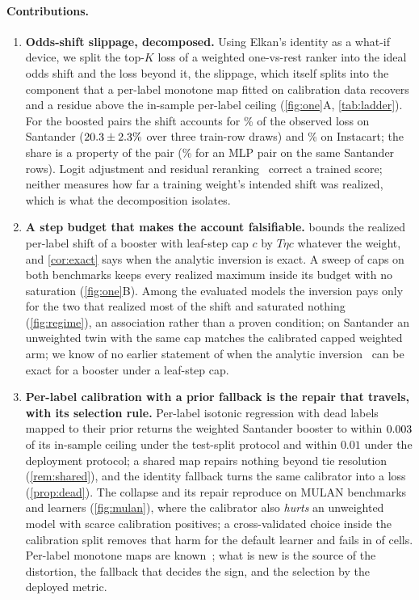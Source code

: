 \documentclass[runningheads]{llncs}
\begin{document}
\paragraph{Contributions.}
\begin{enumerate}[leftmargin=*,nosep]
\item \textbf{Odds-shift slippage, decomposed.} Using Elkan's identity as a what-if device, we split the top-$K$ loss of a weighted one-vs-rest ranker into the ideal odds shift and the loss beyond it, the slippage, which itself splits into the component that a per-label monotone map fitted on calibration data recovers and a residue above the in-sample per-label ceiling (\cref{fig:one}A, \cref{tab:ladder}). For the boosted pairs the shift accounts for \noddsShare\% of the observed loss on Santander ($20.3 \pm 2.3\%$ over three train-row draws) and \nIoddsShare\% on Instacart; the share is a property of the pair (\nModdsShare\% for an MLP pair on the same Santander rows). Logit adjustment and residual reranking~\cite{Menon2021LogitAdjust,Wang2026BeyondLA} correct a trained score; neither measures how far a training weight's intended shift was realized, which is what the decomposition isolates.
\item \textbf{A step budget that makes the account falsifiable.}  bounds the realized per-label shift of a booster with leaf-step cap $c$ by $T\eta c$ whatever the weight, and \cref{cor:exact} says when the analytic inversion is exact. A sweep of \ncapN{} caps on both benchmarks keeps every realized maximum inside its budget with no saturation (\cref{fig:one}B). Among the evaluated models the inversion pays only for the two that realized most of the shift and saturated nothing (\cref{fig:regime}), an association rather than a proven condition; on Santander an unweighted twin with the same cap matches the calibrated capped weighted arm; we know of no earlier statement of when the analytic inversion~\cite{Elkan2001} can be exact for a booster under a leaf-step cap.
\item \textbf{Per-label calibration with a prior fallback is the repair that travels, with its selection rule.} Per-label isotonic regression with dead labels mapped to their prior returns the weighted Santander booster to within $0.003$ of its in-sample ceiling under the test-split protocol and within $0.01$ under the deployment protocol; a shared map repairs nothing beyond tie resolution (\cref{rem:shared}), and the identity fallback turns the same calibrator into a loss (\cref{prop:dead}). The collapse and its repair reproduce on \nnMulan{} MULAN benchmarks and \nnLearners{} learners (\cref{fig:mulan}), where the calibrator also \emph{hurts} an unweighted model with scarce calibration positives; a cross-validated choice inside the calibration split removes that harm for the default learner and fails in \nnTauSelBelowRaw{} of \nnTauCells{} cells. Per-label monotone maps are known~\cite{Zadrozny2002,Tae2026MRP}; what is new is the source of the distortion, the fallback that decides the sign, and the selection by the deployed metric.
\end{enumerate}
\end{document}
